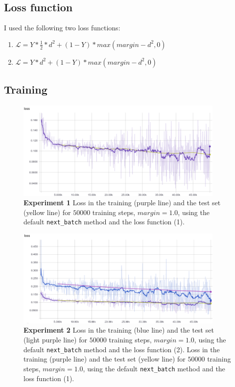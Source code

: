 \documentclass{article}
\begin{document}
\subsection{Loss function}

I used the following two loss functions:
\begin{enumerate}
\item $\mathcal{L} =  Y * \frac{1}{2} * d^2 + (1-Y) * max(margin - d^2, 0)$
\item $\mathcal{L} =  Y * d^2 + (1-Y) * max(margin - d^2, 0)$
\end{enumerate}


\subsection{Training}

\begin{figure}[h!]
\centering
\includegraphics[width=10.2cm]{siamese.png}
\caption{\textbf{Experiment 1} Loss in the training (purple line) and the test set (yellow line) for $50000$ training steps, $margin = 1.0$, using the default \texttt{next\_batch} method and the loss function (1).}
\label{fig:siamese}
\end{figure}



\begin{figure}[h!]
\centering
\includegraphics[width=10.2cm]{siamese-1.png}
\caption{\textbf{Experiment 2} Loss in the training (blue line) and the test set (light purple line) for $50000$ training steps, $margin = 1.0$, using the default \texttt{next\_batch} method and the loss function (2).
Loss in the training (purple line) and the test set (yellow line) for $50000$ training steps, $margin = 1.0$, using the default \texttt{next\_batch} method and the loss function (1).}
\label{fig:siamese-1}
\end{figure}
\end{document}
